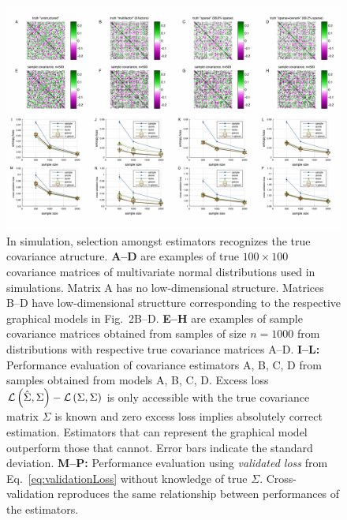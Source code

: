 \begin{figure}[htp]
\centering
\includegraphics[width=1.0\textwidth]{figures/Figure3.pdf}
\caption{
In simulation, selection amongst estimators recognizes the true covariance atructure. 
{\bf A--D} are examples of true $100\times100$ covariance matrices of multivariate normal distributions used in simulations. Matrix A has no low-dimensional structure. Matrices B--D have low-dimensional structture corresponding to the respective graphical models in Fig.~2B--D.
{\bf E--H} are examples of sample covariance matrices obtained from samples of size $n=1000$ from distributions with respective true covariance matrices A--D.
{\bf I--L:} Performance evaluation of covariance estimators A, B, C, D from samples obtained from models A, B, C, D.  Excess loss $\mathcal L\left(\hat\Sigma,\Sigma\right)-\mathcal L\left(\Sigma,\Sigma\right)$ is only accessible with the true covariance matrix $\Sigma$ is known and zero excess loss implies absolutely correct estimation. Estimators that can represent the graphical model outperform those that cannot.  Error bars indicate the standard deviation. 
{\bf M--P:} Performance evaluation using \emph{validated loss} from Eq.~\ref{eq:validationLoss} without knowledge of true $\Sigma$. Cross-validation reproduces the same relationship between performances of the estimators.
}\label{fig:03}
\end{figure}